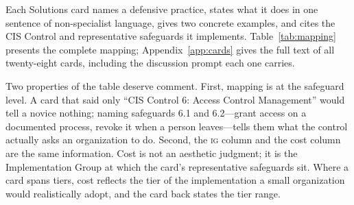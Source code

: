 \documentclass[10pt,twocolumn,letterpaper]{article}
\newcommand{\ig}[1]{\textsc{ig#1}}
\begin{document}
Each Solutions card names a defensive practice, states what it does in one
sentence of non-specialist language, gives two concrete examples, and cites the
CIS Control and representative safeguards it implements.
Table~\ref{tab:mapping} presents the complete mapping; Appendix~\ref{app:cards}
gives the full text of all twenty-eight cards, including the discussion prompt
each one carries.

Two properties of the table deserve comment. First, mapping is at the safeguard
level. A card that said only ``CIS Control 6: Access Control Management'' would
tell a novice nothing; naming safeguards 6.1 and 6.2---grant access on a
documented process, revoke it when a person leaves---tells them what the control
actually asks an organization to do. Second, the \ig{} column and the cost
column are the same information. Cost is not an aesthetic judgment; it is the
Implementation Group at which the card's representative safeguards sit. Where a
card spans tiers, cost reflects the tier of the implementation a small
organization would realistically adopt, and the card back states the tier range.
\end{document}
